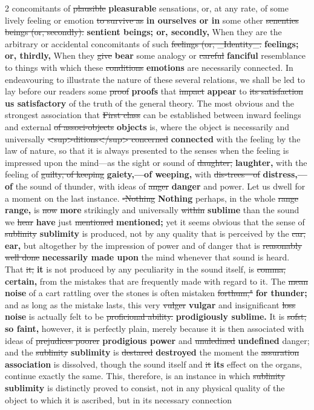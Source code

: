 \documentclass[10pt]{article}
\begin{document}
\begin{multicols}{2}
concomitants of \sout{plausible} \textbf{pleasurable} sensations, or, at any rate, of some lively feeling or emotion \sout{to survive as} \textbf{in ourselves or in} some other \sout{senenties beings (or, secondly).} \textbf{sentient beings; or, secondly,} When they are the arbitrary or accidental concomitants of such \sout{feelings (or, \_Identity\_.} \textbf{feelings; or, thirdly,} When they \sout{give} \textbf{bear} some analogy or \sout{careful} \textbf{fanciful} resemblance to things with which these \sout{conditions} \textbf{emotions} are necessarily connected. In endeavouring to illustrate the nature of these several relations, we shall be led to lay before our readers some \sout{proof} \textbf{proofs} that \sout{impact} \textbf{appear} to \sout{its satisfaction} \textbf{us satisfactory} of the truth of the general theory. The most obvious and the strongest association that \sout{First class} can be established between inward feelings and external \sout{of associ-objects} \textbf{objects} is, where the object is necessarily and universally \sout{<sup>ditions</sup> concerned} \textbf{connected} with the feeling by the law of nature, so that it is always presented to the senses when the feeling is impressed upon the mind—as the sight or sound of \sout{daughter,} \textbf{laughter,} with the feeling of \sout{guilty, of keeping} \textbf{gaiety,—of weeping,} with \sout{dis-trees—of} \textbf{distress,—of} the sound of thunder, with ideas of \sout{anger} \textbf{danger} and power. Let us dwell for a moment on the last instance. \sout{-Nothing} \textbf{Nothing} perhaps, in the whole \sout{range} \textbf{range,} is \sout{now} \textbf{more} strikingly and universally \sout{within} \textbf{sublime} than the sound we \sout{hear} \textbf{have} just \sout{mentioned} \textbf{mentioned;} yet it seems obvious that the sense of \sout{sublinity} \textbf{sublimity} is produced, not by any quality that is perceived by the \sout{car,} \textbf{ear,} but altogether by the impression of power and of danger that is \sout{reasonably well done} \textbf{necessarily made upon} the mind whenever that sound is heard. That \sout{it,} \textbf{it} is not produced by any peculiarity in the sound itself, is \sout{comma,} \textbf{certain,} from the mistakes that are frequently made with regard to it. The \sout{mean} \textbf{noise} of a cart rattling over the stones is often mistaken \sout{forthum,"} \textbf{for thunder;} and as long as the mistake lasts, this very \sout{vulger} \textbf{vulgar} and insignificant \sout{loss} \textbf{noise} is actually felt to be \sout{proficional ability.} \textbf{prodigiously sublime.} It is \sout{sofst,} \textbf{so faint,} however, it is perfectly plain, merely because it is then associated with ideas of \sout{prejudices poorer} \textbf{prodigious power} and \sout{unuledined} \textbf{undefined} danger; and the \sout{sublinity} \textbf{sublimity} is \sout{destared} \textbf{destroyed} the moment the \sout{assuration} \textbf{association} is dissolved, though the sound itself and \sout{it} \textbf{its} effect on the organs, continue exactly the same. This, therefore, is an instance in which \sout{sublinity} \textbf{sublimity} is distinctly proved to consist, not in any physical quality of the object to which it is ascribed, but in its necessary connection 
\end{multicols}
\end{document}
